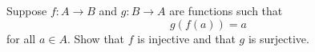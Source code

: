 Suppose $f:A \to B$ and $g:B \to A$ are functions such that 
\[g(f(a)) = a\] for all $a \in A$. Show that $f$ is injective and that $g$ is surjective.
